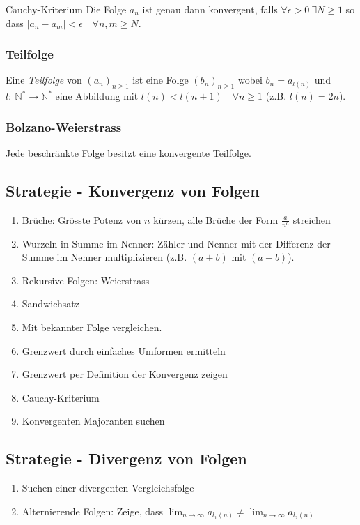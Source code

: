 \documentclass[a4paper,10pt]{article}
\def\limn{\lim_{n\to \infty}}
\def\N{\mathbb{N}}
\begin{document}
\begin{mainbox}{Cauchy-Kriterium}
Die Folge $a_n$ ist genau dann konvergent, falls $\forall \epsilon > 0 \ \exists N \ge 1$ so dass $| a_n - a_m | < \epsilon \quad \forall n,m \ge N$.
\end{mainbox}

\subsubsection{Teilfolge}
Eine \emph{Teilfolge} von $(a_n)_{n \geq 1}$ ist eine Folge $(b_n)_{n \geq 1}$ wobei $b_n = a_{l(n)}$ und $l: \: \N^* \to \N^*$ eine Abbildung mit $l(n) < l(n+1) \quad \forall n \ge 1$ (z.B. $l(n) = 2n$). 

\subsubsection{Bolzano-Weierstrass}
\begin{mainbox}{}
Jede beschränkte Folge besitzt eine konvergente Teilfolge.
\end{mainbox}

\subsection{Strategie - Konvergenz von Folgen}
\begin{enumerate}
 \item Brüche: Grösste Potenz von $n$ kürzen, alle Brüche der Form $\frac{a}{n^a}$ streichen
 \item Wurzeln in Summe im Nenner: Zähler und Nenner mit der Differenz der Summe im Nenner multiplizieren (z.B. $(a+b)$ mit $(a-b)$).
 \item Rekursive Folgen: Weierstrass
 \item Sandwichsatz
 \item Mit bekannter Folge vergleichen.
 \item Grenzwert durch einfaches Umformen ermitteln
 \item Grenzwert per Definition der Konvergenz zeigen
 \item Cauchy-Kriterium
 \item Konvergenten Majoranten suchen
\end{enumerate}

\subsection{Strategie - Divergenz von Folgen}
\begin{enumerate}
 \item Suchen einer divergenten Vergleichsfolge
 \item Alternierende Folgen: Zeige, dass $\limn a_{l_1(n)} \ne \limn a_{l_2(n)}$
\end{enumerate}
\end{document}
